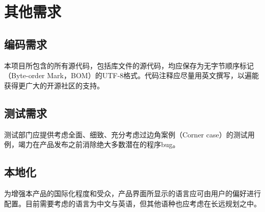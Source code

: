 \chapter{其他需求}


\section{编码需求}
本项目所包含的所有源代码，包括库文件的源代码，均应保存为无字节顺序标记（Byte-order Mark，BOM）的UTF-8格式。代码注释应尽量用英文撰写，以遍能获得更广大的开源社区的支持。

\section{测试需求}
测试部门应提供考虑全面、细致、充分考虑过边角案例（Corner case）的测试用例，竭力在产品发布之前消除绝大多数潜在的程序bug。

\section{本地化}
为增强本产品的国际化程度和受众，产品界面所显示的语言应可由用户的偏好进行配置。目前需要考虑的语言为中文与英语，但其他语种也应考虑在长远规划之中。

